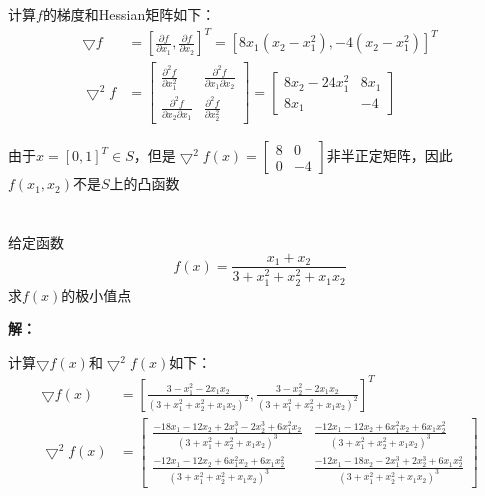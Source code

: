 \documentclass[a4paper]{article}
\begin{document}
计算$f$的梯度和Hessian矩阵如下：
\begin{equation}
\begin{aligned}
\bigtriangledown f &=\left[\frac{\partial f}{\partial x_1},\frac{\partial f}{\partial x_2}\right]^T=[8x_1(x_2-x_1^2),-4(x_2-x_1^2)]^T \\
\bigtriangledown^2 f &= 
\left[
\begin{array}{cc}
\frac{\partial^2 f}{\partial x_1^2} & \frac{\partial^2  f}{\partial x_1\partial x_2} \\
\frac{\partial^2 f}{\partial x_2\partial x_1} & \frac{\partial^2 f}{\partial x_2^2}
\end{array}
\right]=
\left[
\begin{array}{cc}
8x_2-24x_1^2 & 8x_1 \\
8x_1 & -4
\end{array}
\right]
\end{aligned}
\end{equation}

由于$x=[0,1]^T\in S$，但是$\bigtriangledown^2 f(x)=\left[
\begin{array}{cc}
8 & 0 \\
0 & -4
\end{array}
\right]$非半正定矩阵，因此$f(x_1,x_2)$不是$S$上的凸函数

\section{}
给定函数
\begin{equation*}
f(x)=\frac{x_1+x_2}{3+x_1^2+x_2^2+x_1x_2}
\end{equation*}
求$f(x)$的极小值点

\textbf{解：}

计算$\bigtriangledown f(x)$和$\bigtriangledown^2 f(x)$如下：
\begin{equation}
\begin{aligned}
\bigtriangledown f(x) &=\left[\frac{3-x_1^2-2x_1x_2}{(3+x_1^2+x_2^2+x_1x_2)^2},\frac{3-x_2^2-2x_1x_2}{(3+x_1^2+x_2^2+x_1x_2)^2}\right]^T \\
\bigtriangledown^2 f(x) &= 
\left[
\begin{array}{cc}
\frac{-18x_1-12x_2+2x_1^3-2x_2^3+6x_1^2x_2}{(3+x_1^2+x_2^2+x_1x_2)^3} & \frac{-12x_1-12x_2+6x_1^2x_2+6x_1x_2^2}{(3+x_1^2+x_2^2+x_1x_2)^3} \\
\frac{-12x_1-12x_2+6x_1^2x_2+6x_1x_2^2}{(3+x_1^2+x_2^2+x_1x_2)^3}  & \frac{-12x_1-18x_2-2x_1^3+2x_2^3+6x_1x_2^2}{(3+x_1^2+x_2^2+x_1x_2)^3}
\end{array}
\right]
\end{aligned}
\end{equation}
\end{document}
